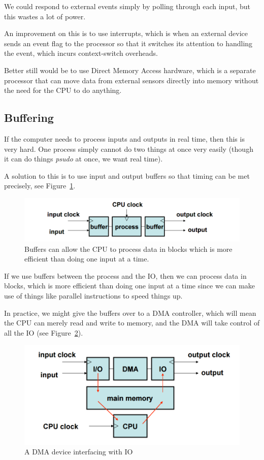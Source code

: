 We could respond to external events simply by polling through each input, but
this wastes a lot of power.

An improvement on this is to use interrupts, which is when an external device
sends an event flag to the processor so that it switches its attention to
handling the event, which incurs context-switch overheads.

Better still would be to use Direct Memory Access hardware, which is a separate
processor that can move data from external sensors directly into memory without
the need for the CPU to do anything.

\subsection{Buffering}

If the computer needs to process inputs and outputs in real time, then this is
very hard. One process simply cannot do two things at once very easily (though
it can do things \textit{psudo} at once, we want real time).

A solution to this is to use input and output buffers so that timing can be met
precisely, see Figure~\ref{buffers}.

\begin{figure}[ht]
  \includegraphics[width=\textwidth]{images/buffers}
  \caption{Buffers can allow the CPU to process data in blocks which is more
  efficient than doing one input at a time.}
  \label{buffers}
\end{figure}

If we use buffers between the process and the IO, then we can process data in
blocks, which is more efficient than doing one input at a time since we can make
use of things like parallel instructions to speed things up.

In practice, we might give the buffers over to a DMA controller, which will mean
the CPU can merely read and write to memory, and the DMA will take control of
all the IO (see Figure~\ref{DMA}).

\begin{figure}[ht]
  \includegraphics[width=\textwidth]{images/DMA}
  \caption{A DMA device interfacing with IO}
  \label{DMA}
\end{figure}

